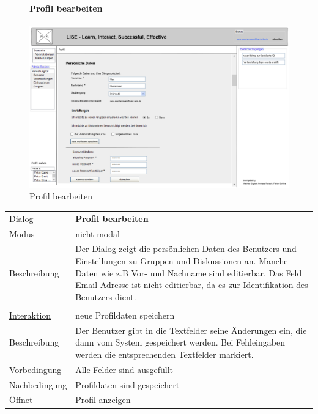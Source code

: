 \documentclass[12pt,a4paper]{article}
\begin{document}
{\begin{figure}[H]
	\paragraph{Profil bearbeiten}
	\includegraphics[width=\textwidth]{Bilder/Mockups/GUI/ProfilBearbeiten.png}
	\caption{Profil bearbeiten}
	\label{ProfilBearbeiten}
\end{figure}

\begin{tabular}{l p{12cm}}
Dialog 	 & \textbf{Profil bearbeiten} \\ 
Modus & nicht modal\\ 
Beschreibung   	 & Der Dialog zeigt die persönlichen Daten des Benutzers und Einstellungen zu Gruppen und Diskussionen an. Manche Daten wie z.B Vor- und Nachname sind editierbar. Das Feld Email-Adresse ist nicht editierbar, da es zur Identifikation des Benutzers dient.\\\\

\underline{Interaktion}  	 & neue Profildaten speichern\\ 
Beschreibung   	 & Der Benutzer gibt in die Textfelder seine Änderungen ein, die dann vom System gespeichert werden. Bei Fehleingaben werden die entsprechenden Textfelder markiert.\\
Vorbedingung   	 & Alle Felder sind ausgefüllt\\
Nachbedingung 	 & Profildaten sind gespeichert\\
Öffnet			 & \glqq Profil anzeigen\grqq\\
\end{tabular}\\\\

}
\end{document}
